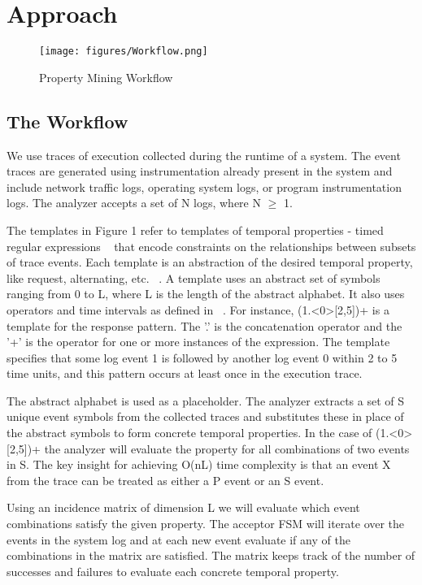 \documentclass[]{sigplanconf}
\begin{document}
\section{Approach}

\begin{figure}[h]
  \centering
  \texttt{[image: figures/Workflow.png]}
  \caption{Property Mining Workflow}
  \label{fig:work-flow Overview}
\end{figure}

\subsection{The Workflow}

We use traces of execution collected during the runtime of a system. The event traces are generated using instrumentation already present in the system and include network traffic logs, operating system logs, or program instrumentation logs. The analyzer accepts a set of N logs, where N $\ge$ 1.

The templates in Figure 1 refer to templates of temporal properties - timed regular expressions ~\cite{timedregex} that encode constraints on the relationships between subsets of trace events. Each template is an abstraction of the desired temporal property, like request, alternating, etc. ~\cite{evans1}. A template uses an abstract set of symbols ranging from 0 to L, where L is the length of the abstract alphabet. It also uses operators and time intervals as defined in ~\cite{timedregex}. For instance, (1.\textless0\textgreater[2,5])+ is a template for the response pattern. The '.' is the concatenation operator and the '+' is the operator for one or more instances of the expression.  The template specifies that some log event 1 is followed by another log event 0 within 2 to 5 time units, and this pattern occurs at least once in the execution trace. 

The abstract alphabet is used as a placeholder. The analyzer extracts a set of S unique event symbols from the collected traces and substitutes these in place of the abstract symbols to form concrete temporal properties. In the case of (1.\textless0\textgreater[2,5])+ the analyzer will evaluate the property for all combinations of two events in S. The key insight for achieving O(nL) time complexity is that an event X from the trace can be treated as either a P event or an S event.


Using an incidence matrix of dimension L we will evaluate which event combinations satisfy the given property. The acceptor FSM will iterate over the events in the system log and at each new event evaluate if any of the combinations in the matrix are satisfied. The matrix keeps track of the number of successes and failures to evaluate each concrete temporal property. 
\end{document}
